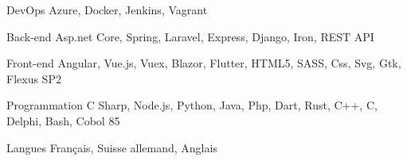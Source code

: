 

\begin{cvskills}

  \cvskill
    {DevOps} %
    {Azure, Docker, Jenkins, Vagrant} %

  \cvskill
    {Back-end} %
    {Asp.net Core, Spring, Laravel, Express, Django, Iron, REST API} %

  \cvskill
    {Front-end} %
    {Angular, Vue.js, Vuex, Blazor, Flutter, HTML5, SASS, Css, Svg, Gtk, Flexus SP2} %

  \cvskill
    {Programmation} %
    {C Sharp, Node.js, Python, Java, Php, Dart, Rust, C++, C, Delphi, Bash, Cobol 85} %

  \cvskill
    {Langues} %
    {Français, Suisse allemand, Anglais} %

\end{cvskills}
